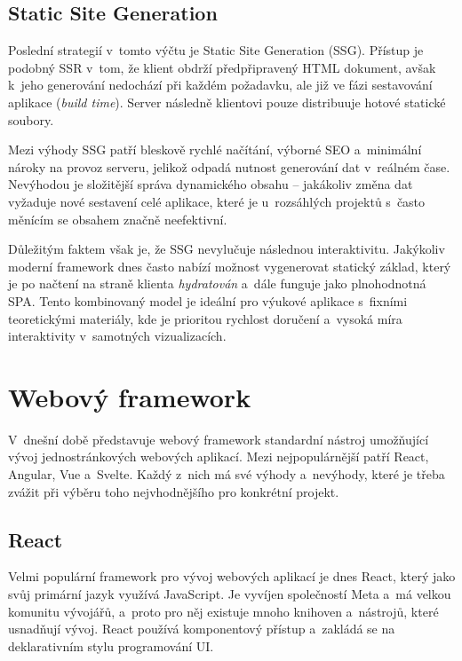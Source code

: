 \subsection{Static Site Generation}
\label{subsec:static_site_generation}

Poslední strategií v~tomto výčtu je Static Site Generation (SSG).
Přístup je podobný SSR v~tom, že klient obdrží předpřipravený HTML dokument, avšak k~jeho generování nedochází při každém požadavku, ale již ve fázi sestavování aplikace (\textit{build time}).
Server následně klientovi pouze distribuuje hotové statické soubory.

Mezi výhody SSG patří bleskově rychlé načítání, výborné SEO a~minimální nároky na provoz serveru, jelikož odpadá nutnost generování dat v~reálném čase.
Nevýhodou je složitější správa dynamického obsahu -- jakákoliv změna dat vyžaduje nové sestavení celé aplikace, které je u~rozsáhlých projektů s~často měnícím se obsahem značně neefektivní.~\cite{kumar2025}

Důležitým faktem však je, že SSG nevylučuje následnou interaktivitu.
Jakýkoliv moderní framework dnes často nabízí možnost vygenerovat statický základ, který je po načtení na straně klienta \textit{hydratován} a~dále funguje jako plnohodnotná SPA.
Tento kombinovaný model je ideální pro výukové aplikace s~fixními teoretickými materiály, kde je prioritou rychlost doručení a~vysoká míra interaktivity v~samotných vizualizacích.~\cite{kumar2025}

\section{Webový framework}
\label{sec:web_framework}

V~dnešní době představuje webový framework standardní nástroj umožňující vývoj jednostránkových webových aplikací.
Mezi nejpopulárnější patří React, Angular, Vue a~Svelte.
Každý z~nich má své výhody a~nevýhody, které je třeba zvážit při výběru toho nejvhodnějšího pro konkrétní projekt.

\subsection{React}
\label{subsec:react}

Velmi populární framework pro vývoj webových aplikací je dnes React, který jako svůj primární jazyk využívá JavaScript.
Je vyvíjen společností Meta a~má velkou komunitu vývojářů, a~proto pro něj existuje mnoho knihoven a~nástrojů, které usnadňují vývoj.
React používá komponentový přístup a~zakládá se na deklarativním stylu programování UI.~\cite{react}

